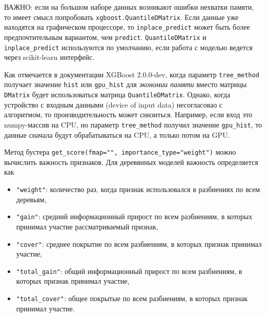 \documentclass[%
	11pt,
	a4paper,
	utf8,
		]{article}
\begin{document}
ВАЖНО: если на большом наборе данных возникают ошибки нехватки памяти, то имеет смысл попробовать \verb|xgboost.QuantileDMatrix|. Если данные уже находятся на графическом процессоре, то \verb|inplace_predict| может быть более предпочтительным вариантом, чем \verb|predict|. \verb|QuantileDMatrix| и \verb|inplace_predict| используются по умолчанию, если работа с моделью ведется через scikit-learn интерфейс.


Как отмечается в документации XGBoost 2.0.0-dev, когда параметр \verb|tree_method| получает значение \verb|hist| или \verb|gpu_hist| для \emph{экономии памяти} вместо матрицы \verb|DMatrix| будет использоваться матрица \verb|QuantileDMatrix|. Однако, когда устройство с входным данными (device of input data) несогласовао с алгоритмом, то производительность может снизиться. Например, если вход это numpy-массив на CPU, но параметр \verb|tree_method| получил значение \verb|gpu_hist|, то данные сначала будут обрабатываться на CPU, а только потом на GPU.

Метод бустера \verb|get_score(fmap="", importance_type="weight")| можно вычислить важность признаков. Для деревянных моделей важность определяется как
\begin{itemize}
	\item \verb|"weight"|: количество раз, когда признак использовался в разбиениях по всем деревьям,
	
	\item \verb|"gain"|: средний информационный прирост по всем разбиениям, в которых принимал участие рассматриваемый признак,
	
	\item \verb|"cover"|: среднее покрытие по всем разбиениям, в которых признак принимал участие,
	
	\item \verb|"total_gain"|: общий информационный прирост по всем разбиениям, в которых признак принимал участие,
	
	\item \verb|"total_cover"|: общее покрытые по всем разбиениям, в которых признак принимал участие.
\end{itemize} 
\end{document}
